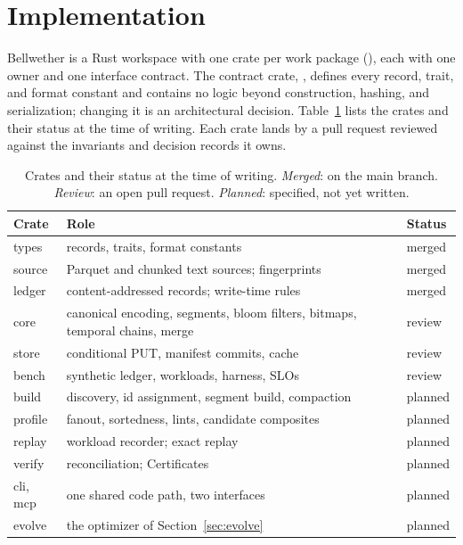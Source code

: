 \section{Implementation}\label{sec:impl}

Bellwether is a Rust workspace with one crate per work package
(), each with one owner and one interface contract. The
contract crate,
, defines every record, trait, and format constant and
contains no logic beyond construction, hashing, and serialization; changing it
is an architectural decision. Table~\ref{tab:crates} lists the crates and their
status at the time of writing. Each crate lands by a pull request reviewed
against the invariants and decision records it owns.

\begin{table}[t]
  \caption{Crates and their status at the time of writing. \emph{Merged}: on
    the main branch. \emph{Review}: an open pull request. \emph{Planned}:
    specified, not yet written.}
  \label{tab:crates}
  \small
  \begin{tabular}{@{}l>{\raggedright\arraybackslash}p{}l@{}}
    \toprule
    Crate & Role & Status \\
    \midrule
    types & records, traits, format constants & merged \\
    source & Parquet and chunked text sources; fingerprints & merged \\
    ledger & content-addressed records; write-time rules & merged \\
    core & canonical encoding, segments, bloom filters, bitmaps, temporal
      chains, merge & review \\
    store & conditional PUT, manifest commits, cache & review \\
    bench & synthetic ledger, workloads, harness, SLOs & review \\
    build & discovery, id assignment, segment build, compaction & planned \\
    profile & fanout, sortedness, lints, candidate composites & planned \\
    replay & workload recorder; exact replay & planned \\
    verify & reconciliation; Certificates & planned \\
    cli, mcp & one shared code path, two interfaces & planned \\
    evolve & the optimizer of Section~\ref{sec:evolve} & planned \\
    \bottomrule
  \end{tabular}
\end{table}


